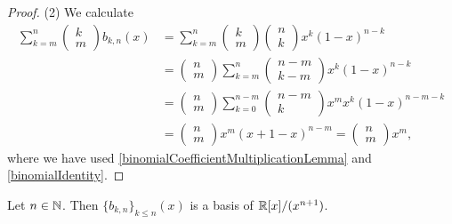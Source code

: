 \begin{proof}
(2) We calculate
\begin{align*}
\sum_{k=m}^n \begin{pmatrix}
k \\ m
\end{pmatrix}b_{k,n}(x) &= \sum_{k=m}^n \begin{pmatrix}
k \\ m
\end{pmatrix}\begin{pmatrix}
n \\ k
\end{pmatrix}x^k(1-x)^{n-k} \\
&= \begin{pmatrix}
n \\ m
\end{pmatrix}\sum_{k=m}^n \begin{pmatrix}
n-m \\ k-m
\end{pmatrix}x^k(1-x)^{n-k} \\
&= \begin{pmatrix}
n \\ m
\end{pmatrix}\sum_{k=0}^{n-m} \begin{pmatrix}
n-m \\ k
\end{pmatrix}x^mx^k(1-x)^{n-m-k} \\
&= \begin{pmatrix}
n \\ m
\end{pmatrix}x^m(x+1-x)^{n-m} = \begin{pmatrix}
n \\ m
\end{pmatrix}x^m,
\end{align*}
where we have used \ref{binomialCoefficientMultiplicationLemma} and \ref{binomialIdentity}.
\end{proof}
\begin{corollary}
Let $n\in\mathbb{N}$. Then $\{b_{k,n}\}_{k\leq n}(x)$ is a basis of $\mathbb{R}[x]/(x^{n+1})$.
\end{corollary}

